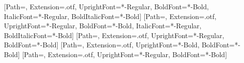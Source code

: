\ifdefined\GuideCJKFontPath
  \usepackage{xeCJK}
  \setCJKmainfont{\GuideCJKSerif}[Path=\GuideCJKFontPath, Extension=.otf,
    UprightFont=*-Regular, BoldFont=*-Bold, ItalicFont=*-Regular,
    BoldItalicFont=*-Bold]
  \setCJKsansfont{\GuideCJKSans}[Path=\GuideCJKFontPath, Extension=.otf,
    UprightFont=*-Regular, BoldFont=*-Bold, ItalicFont=*-Regular,
    BoldItalicFont=*-Bold]
  \setCJKmonofont{\GuideCJKSans}[Path=\GuideCJKFontPath, Extension=.otf,
    UprightFont=*-Regular, BoldFont=*-Bold]
  [Path=\GuideCJKFontPath,
    Extension=.otf, UprightFont=*-Bold, BoldFont=*-Bold]
  [Path=\GuideCJKFontPath,
    Extension=.otf, UprightFont=*-Regular, BoldFont=*-Bold]
  \let\GuideLatinHeadFont\HeadFont
  \renewcommand{\HeadFont}{\GuideLatinHeadFont\CJKfamily{GuideCJKHead}}
  \let\GuideLatinHeadSemi\HeadSemi
  \renewcommand{\HeadSemi}{\GuideLatinHeadSemi\CJKfamily{GuideCJKHead}}
  \let\GuideLatinLabelFont\LabelFont
  \renewcommand{\LabelFont}{\GuideLatinLabelFont\CJKfamily{GuideCJKLabel}}
  \let\GuideLatinDisplayFont\DisplayFont
  \renewcommand{\DisplayFont}{\GuideLatinDisplayFont\CJKfamily{GuideCJKHead}}
\fi

\linespread{1.18}
\setlength{\parindent}{0pt}
\setlength{\parskip}{0.62em plus 2pt minus 1pt}
\setlength{\emergencystretch}{3em}
\raggedbottom
{}

\let\GuideOrigTexttt\texttt
\renewcommand{\texttt}[1]{\leavevmode{\color{AccentDark}\GuideOrigTexttt{#1}}}

